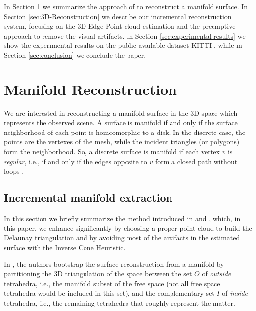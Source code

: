 In Section \ref{sec:manifold} we summarize the approach of \cite{litvinov_lhuillier_13} to reconstruct a manifold surface.
In Section \ref{sec:3D-Reconstruction} we describe our incremental reconstruction system, focusing on the 3D Edge-Point cloud estimation and the preemptive approach to remove the visual artifacts. 
In Section \ref{sec:experimental-results} we show the experimental results on the public available dataset KITTI \cite{Geiger_et_al12}, while in Section \ref{sec:conclusion} we conclude the paper.

\section{Manifold Reconstruction}%
\label{sec:manifold}
We are interested in reconstructing a manifold surface in the 3D space which represents the observed scene.
A surface is manifold if and only if the surface neighborhood of each point is homeomorphic to a disk.
In the discrete case, the points are the vertexes of the mesh, while the incident triangles (or polygons) form the neighborhood. 
So, a discrete surface is manifold if each vertex $v$ is \emph{regular}, i.e., if and only if the edges opposite to $v$ form a closed path without loops \cite{lhuillier_Yu2013}. 

\subsection{Incremental manifold extraction}
\label{subsec:incrementalManifold_2}
In this section we briefly summarize the method introduced in \cite{litvinov_lhuillier_13} and \cite{litvinov_Lhiuller14}, which, in this paper, we enhance significantly by choosing a proper point cloud to build the Delaunay triangulation and by avoiding most  of the artifacts in the estimated surface with the Inverse Cone Heuristic.

In \cite{litvinov_lhuillier_13}, the authors bootstrap the surface reconstruction from a manifold by partitioning the 3D triangulation of the space between the set $O$ of \emph{outside} tetrahedra, i.e., the manifold subset of the free space (not all free space tetrahedra would be included in this set), and the complementary set $I$ of \emph{inside} tetrahedra, i.e., the remaining tetrahedra that roughly represent the matter.


